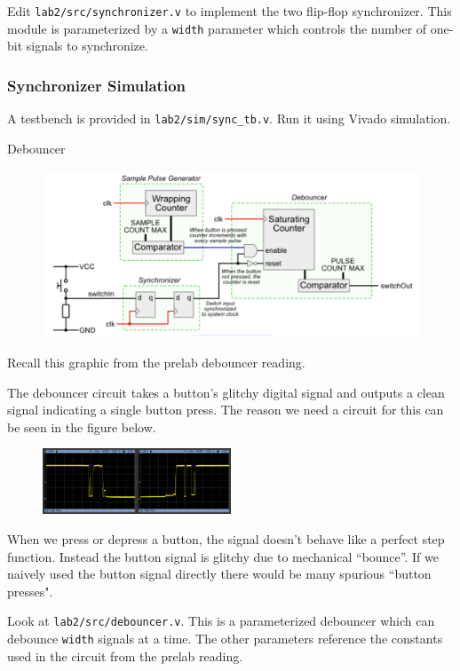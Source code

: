 \documentclass[11pt]{article}
\makeatletter
\renewcommand{\subsection}
{\@startsection {subsection}{1}{0pt}
 {-1ex}
 {0.5ex}
 {\bfseries\normalsize}}
\makeatother
\begin{document}
Edit \verb|lab2/src/synchronizer.v| to implement the two flip-flop synchronizer.
This module is parameterized by a \verb|width| parameter which controls the number of one-bit signals to synchronize.

\subsubsection{Synchronizer Simulation}
A testbench is provided in \verb|lab2/sim/sync_tb.v|. Run it using Vivado simulation.

\subsection{Debouncer}
\begin{figure}[H]
  \centerline{\includegraphics[height=5cm]{figs/debouncer.png}}
\end{figure}

Recall this graphic from the prelab debouncer reading.

The debouncer circuit takes a button's glitchy digital signal and outputs a clean signal indicating a single button press.
The reason we need a circuit for this can be seen in the figure below.

\begin{figure}[H]
  \centerline{\includegraphics[width=0.5\textwidth]{figs/bouncing.png}}
\end{figure}

When we press or depress a button, the signal doesn't behave like a perfect step function.
Instead the button signal is glitchy due to mechanical ``bounce''.
If we naively used the button signal directly there would be many spurious ``button presses".

Look at \verb|lab2/src/debouncer.v|.
This is a parameterized debouncer which can debounce \verb|width| signals at a time.
The other parameters reference the constants used in the circuit from the prelab reading.
\end{document}
